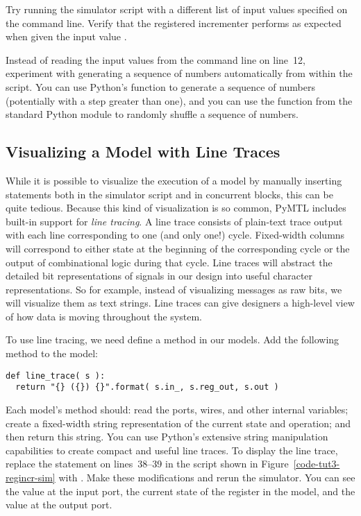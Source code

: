 \documentclass{cbxdoc}
\begin{document}
\begin{task}
  Try running the simulator script with a different list of input values
  specified on the command line. Verify that the registered incrementer
  performs as expected when given the input value .

  Instead of reading the input values from the command line on line~12,
  experiment with generating a sequence of numbers automatically from
  within the script. You can use Python's  function to generate
  a sequence of numbers (potentially with a step greater than one), and
  you can use the  function from the standard Python
   module to randomly shuffle a sequence of numbers.
\end{task}

\subsection{Visualizing a Model with Line Traces}

While it is possible to visualize the execution of a model by manually
inserting  statements both in the simulator script and in
concurrent blocks, this can be quite tedious. Because this kind of
visualization is so common, PyMTL includes built-in support for
\emph{line tracing}. A line trace consists of plain-text trace output
with each line corresponding to one (and only one!) cycle. Fixed-width
columns will correspond to either state at the beginning of the
corresponding cycle or the output of combinational logic during that
cycle. Line traces will abstract the detailed bit representations of
signals in our design into useful character representations. So for
example, instead of visualizing messages as raw bits, we will visualize
them as text strings. Line traces can give designers a high-level view of
how data is moving throughout the system.

To use line tracing, we need define a  method in our
models. Add the following method to the  model:

\vspace{0.05in}
\begin{lstlisting}[numbers={none},basicstyle={\ttfamily},xleftmargin={0.1in}]
def line_trace( s ):
  return "{} ({}) {}".format( s.in_, s.reg_out, s.out )
\end{lstlisting}
\vspace{-0.05in}

Each model's  method should: read the ports, wires, and
other internal variables; create a fixed-width string representation of
the current state and operation; and then return this string. You can use
Python's extensive string manipulation capabilities to create compact and
useful line traces. To display the line trace, replace the 
statement on lines~38--39 in the  script shown in
Figure~\ref{code-tut3-regincr-sim} with . Make
these modifications and rerun the simulator. You can see the value at the
input port, the current state of the register in the model, and the value
at the output port.
\end{document}
